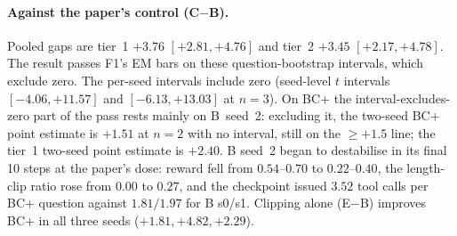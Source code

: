 \documentclass[11pt]{article}
\begin{document}
\paragraph{Against the paper's control (C$-$B).} Pooled gaps are tier~1
$+3.76$ $[+2.81, +4.76]$ and tier~2 $+3.45$ $[+2.17, +4.78]$. The result
passes F1's EM bars on these question-bootstrap intervals, which
exclude zero. The per-seed intervals include zero (seed-level $t$
intervals $[-4.06, +11.57]$ and $[-6.13, +13.03]$ at $n=3$). On BC+ the
interval-excludes-zero part of the pass rests mainly on B~seed~2:
excluding it, the two-seed BC+ point estimate is $+1.51$ at $n=2$ with
no interval, still on the $\geq +1.5$ line; the tier~1 two-seed point
estimate is $+2.40$. B seed~2 began to destabilise in its
final 10 steps at the paper's dose: reward fell from $0.54$--$0.70$ to
$0.22$--$0.40$, the length-clip ratio rose from $0.00$ to $0.27$, and the
checkpoint issued $3.52$ tool calls per BC+ question against $1.81/1.97$
for B s0/s1. Clipping alone (E$-$B) improves BC+ in all three seeds
($+1.81, +4.82, +2.29$).

\begin{table}[t]
\centering
\caption{Pooled gaps (question bootstrap, 10{,}000 resamples) with
per-seed point values and seed-level $t$ intervals ($n=3$). C$-$E is
hardware-matched; as-scored it reads $+2.17\,[+1.29,{+}3.06]$ (tier~1)
and $+0.48\,[-0.84,{+}1.81]$ (tier~2). The C$-$B rows are as-scored;
hardware-matched C$-$B per-seed gaps are QA $4.41, -0.18, 6.47$ and
BC+ $0.00, 1.81, 7.35$ (no hardware-matched pooled C$-$B interval was
computed). C$-$A and C$-$D are hardware-matched.}
\label{tab:gaps}
\end{table}
\end{document}
